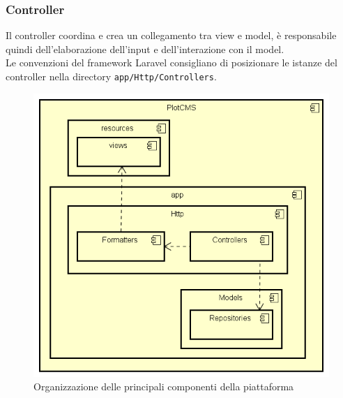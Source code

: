 
\subsubsection{Controller} %
Il controller coordina e crea un collegamento tra view e model, è responsabile quindi dell'elaborazione dell'input e dell'interazione con il model. \\
Le convenzioni del framework Laravel consigliano di posizionare le istanze del controller nella directory \verb!app/Http/Controllers!.

\begin{figure}
	\centering
  \includegraphics[scale=0.6]{immagini/components/important_components_diagram.png}
  \caption{Organizzazione delle principali componenti della piattaforma}
	\label{fig:components} 
\end{figure}

